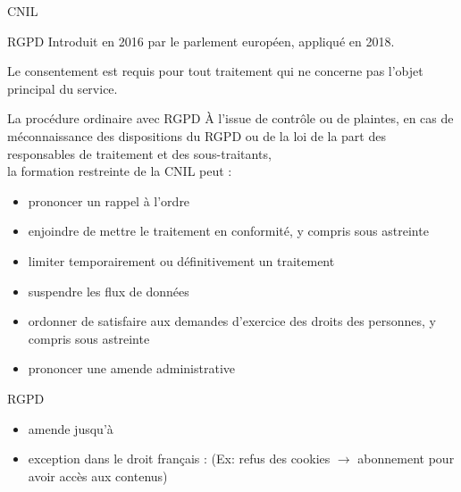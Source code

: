 \begin{frame}{CNIL}
\end{frame}

\begin{frame}{RGPD}
  Introduit en 2016 par le parlement européen, appliqué en 2018.

  Le consentement est requis pour tout traitement qui ne concerne pas l’objet principal du service.

\end{frame}

\begin{frame}{La procédure ordinaire avec RGPD}
  À l’issue de contrôle ou de plaintes, 
  en cas de méconnaissance des dispositions du RGPD ou de la loi de la part 
  des responsables de traitement et des sous-traitants, \\
  la formation restreinte de la CNIL  peut :
  \begin{itemize}
    \item prononcer un rappel à l’ordre
    \item enjoindre de mettre le traitement en conformité, y compris sous astreinte
    \item limiter temporairement ou définitivement un traitement
    \item suspendre les flux de données
    \item ordonner de satisfaire aux demandes d’exercice des droits des personnes, 
          y compris sous astreinte
    \item prononcer une amende administrative
  \end{itemize}
\end{frame}

\begin{frame}{RGPD}
  \begin{itemize}
    \item amende jusqu’à 
    \item exception dans le droit français :  (Ex: refus des cookies $\rightarrow$ abonnement pour avoir accès aux contenus)\\
  \end{itemize}
\end{frame}

